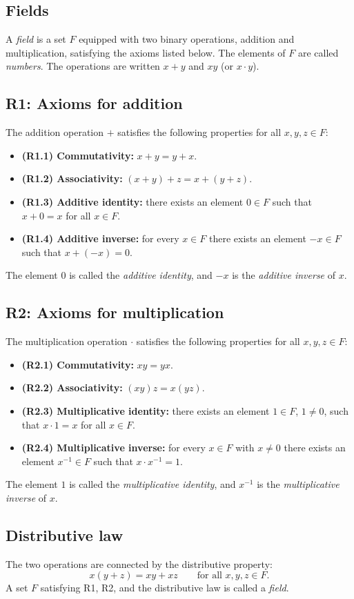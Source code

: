 \documentclass[11pt,a4paper]{article}
\theoremstyle{definition} \newtheorem{definition}{Definition} \theoremstyle{plain} \newtheorem{theorem}{Theorem}
\begin{document}
\subsection{Fields}
A \emph{field} is a set $F$ equipped with two binary operations, addition and multiplication, satisfying the axioms listed below. The elements of $F$ are called \emph{numbers}. The operations are written $x+y$ and $xy$ (or $x\cdot y$).
\subsection{R1: Axioms for addition}
The addition operation $+$ satisfies the following properties for all $x,y,z\in F$:
\begin{itemize}
\item \textbf{(R1.1) Commutativity:} $x+y = y+x$.
\item \textbf{(R1.2) Associativity:} $(x+y)+z = x+(y+z)$.
\item \textbf{(R1.3) Additive identity:} there exists an element $0\in F$
such that $x+0 = x$ for all $x\in F$.
\item \textbf{(R1.4) Additive inverse:} for every $x\in F$ there exists an
element $-x\in F$ such that $x+(-x)=0$. \end{itemize}
The element $0$ is called the \emph{additive identity}, and $-x$ is the \emph{additive inverse} of $x$.
\subsection{R2: Axioms for multiplication}
The multiplication operation $\cdot$ satisfies the following properties for all $x,y,z\in F$:
\begin{itemize}
\item \textbf{(R2.1) Commutativity:} $xy = yx$.
\item \textbf{(R2.2) Associativity:} $(xy)z = x(yz)$.
\item \textbf{(R2.3) Multiplicative identity:} there exists an element
$1\in F$, $1\neq 0$, such that $x\cdot 1 = x$ for all $x\in F$.
\item \textbf{(R2.4) Multiplicative inverse:} for every $x\in F$ with
$x\neq 0$ there exists an element $x^{-1}\in F$ such that
$x\cdot x^{-1} = 1$. \end{itemize}
The element $1$ is called the \emph{multiplicative identity}, and $x^{-1}$ is the \emph{multiplicative inverse} of $x$.
\subsection{Distributive law}
The two operations are connected by the distributive property:
\[ x(y+z) = xy + xz \qquad \text{for all } x,y,z\in F. \]
A set $F$ satisfying R1, R2, and the distributive law is called a \emph{field}.
\end{document}
